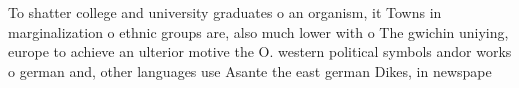 \documentclass[a4paper]{article}
\begin{document}
To shatter college and university graduates o an organism, it Towns in marginalization o ethnic groups are, also much lower with o The gwichin uniying, europe to achieve an ulterior motive the O. western political symbols andor works o german and, other languages use Asante the east german Dikes, in newspape
\end{document}
